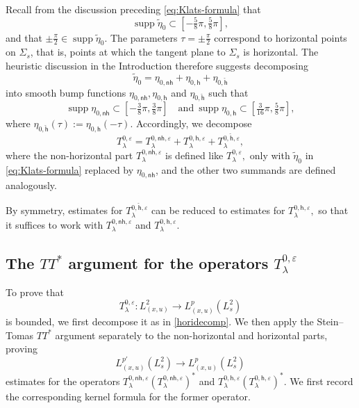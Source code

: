\documentclass[leqno]{amsart}
\theoremstyle{definition}
\theoremstyle{remark}
\numberwithin{equation}{section}
\DeclareMathOperator*{\supp}{supp}
\begin{document}
Recall from the discussion preceding \eqref{eq:Klats-formula} that
\[
\supp\tilde\eta_0\subset [-\tfrac{5}{8}\pi,\tfrac{5}{8}\pi],
\]
and that $\pm\frac{\pi}{2}\in\supp\tilde\eta_0$. The parameters $\tau=\pm\frac{\pi}{2}$ correspond to horizontal points on $\Sigma_s$, that is, points at which the tangent plane to $\Sigma_s$ is horizontal. The heuristic discussion in the Introduction therefore suggests decomposing
\[
\tilde\eta_0 = \eta_{0,\mathsf{nh}} +\eta_{0,\mathsf{h}} +\eta_{0,\mathsf{\check h}}
\]
into smooth bump functions $\eta_{0,\mathsf{nh}},\eta_{0,\mathsf{h}}$ and $\eta_{0,\mathsf{\check h}}$ such that 
$$
\supp\eta_{0,\mathsf{nh}}\subset [-\tfrac 3{8} \pi, \tfrac 3{8} \pi]\quad \text{and} \  \supp\eta_{0,\mathsf{h}}\subset [\tfrac 3{16} \pi, \tfrac 58 \pi],
$$
where $\eta_{0,\mathsf{\check h}}(\tau):=\eta_{0,\mathsf{h}}(-\tau).$ Accordingly, we decompose 
\begin{equation}\label{horidecomp}
T^{0,\varepsilon}_\lambda=T^{0,\mathsf{nh},\varepsilon}_\lambda+T^{0,\mathsf{h},\varepsilon}_\lambda+T^{0,\mathsf{\check h},\varepsilon}_\lambda,
\end{equation}
where  the non-horizontal part $T^{0,\mathsf{nh},\varepsilon}_\lambda$ is defined like $T^{0,\varepsilon}_\lambda,$ only with $\tilde \eta_0$ in \eqref{eq:Klats-formula} replaced by $\eta_{0,\mathsf{nh}}$, and the other two summands are defined analogously.

By symmetry, estimates for $T^{0,\mathsf{\check h},\varepsilon}_\lambda$ can be reduced to estimates for $T^{0,\mathsf{h},\varepsilon}_\lambda,$ so that it suffices to work with $T^{0,\mathsf{nh},\varepsilon}_\lambda$ and $T^{0,\mathsf{h},\varepsilon}_\lambda$. 


\subsection{The $TT^*$ argument for the operators $T^{0,\varepsilon}_\lambda$}\label{TT*0}

To prove that
\[
T^{0,\varepsilon}_\lambda:
L^2_{(x,u)}\to L_{(x,u)}^{p}(L_s^2)
\]
is bounded, we first decompose it as in \eqref{horidecomp}. We then apply the Stein--Tomas $TT^*$ argument separately to the non-horizontal and horizontal parts, proving
\[
L_{(x,u)}^{p'}(L_s^2)\to L_{(x,u)}^{p}(L_s^2)
\]
estimates for the operators $T^{0,\mathsf{nh},\varepsilon}_\lambda
(T^{0,\mathsf{nh},\varepsilon}_\lambda)^*$ and $T^{0,\mathsf{h},\varepsilon}_\lambda
(T^{0,\mathsf{h},\varepsilon}_\lambda)^*$.
We first record the corresponding kernel formula for the former operator.
\end{document}
